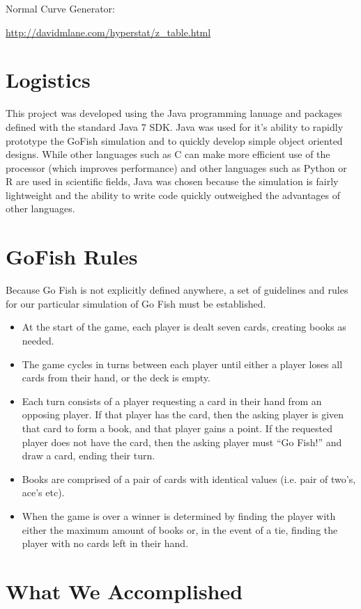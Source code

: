 \documentclass[preprint,12pt]{elsarticle}
\begin{document}
\noindent Normal Curve Generator: 

\noindent\url{http://davidmlane.com/hyperstat/z_table.html}

\section{Logistics}
\label{P:2}

This project was developed using the Java programming lanuage and packages defined with the standard Java 7 SDK. Java was used for it's ability to rapidly prototype the GoFish simulation and to quickly develop simple object oriented designs. While other languages such as C can make more efficient use of the processor (which improves performance) and other languages such as Python or R are used in scientific fields, Java was chosen because the simulation is fairly lightweight and the ability to write code quickly outweighed the advantages of other languages. 

\section{GoFish Rules}
\label{P:3}
Because Go Fish is not explicitly defined anywhere, a set of guidelines and rules for our particular simulation of Go Fish must be established. 

\begin{itemize}
\item At the start of the game, each player is dealt seven cards, creating books as needed.
\item The game cycles in turns between each player until either a player loses all cards from their hand, or the deck is empty.
\item Each turn consists of a player requesting a card in their hand from an opposing player. If that player has the card, then the asking player is given that card to form a book, and that player gains a point. If the requested player does not have the card, then the asking player must “Go Fish!” and draw a card, ending their turn.
\item Books are comprised of a pair of cards with identical values (i.e. pair of two’s, ace’s etc). 
\item When the game is over a winner is determined by finding the player with either the maximum amount of books or, in the event of a tie, finding the player with no cards left in their hand.
\end{itemize}

\section{What We Accomplished}
\label{S:1}
\end{document}
